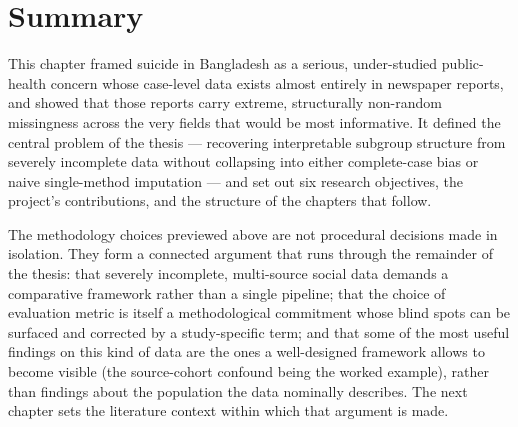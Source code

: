 \section{Summary}

This chapter framed suicide in Bangladesh as a serious, under-studied public-health concern whose case-level data exists almost entirely in newspaper reports, and showed that those reports carry extreme, structurally non-random missingness across the very fields that would be most informative. It defined the central problem of the thesis --- recovering interpretable subgroup structure from severely incomplete data without collapsing into either complete-case bias or naive single-method imputation --- and set out six research objectives, the project's contributions, and the structure of the chapters that follow.

The methodology choices previewed above are not procedural decisions made in isolation. They form a connected argument that runs through the remainder of the thesis: that severely incomplete, multi-source social data demands a comparative framework rather than a single pipeline; that the choice of evaluation metric is itself a methodological commitment whose blind spots can be surfaced and corrected by a study-specific term; and that some of the most useful findings on this kind of data are the ones a well-designed framework allows to become visible (the source-cohort confound being the worked example), rather than findings about the population the data nominally describes. The next chapter sets the literature context within which that argument is made.
